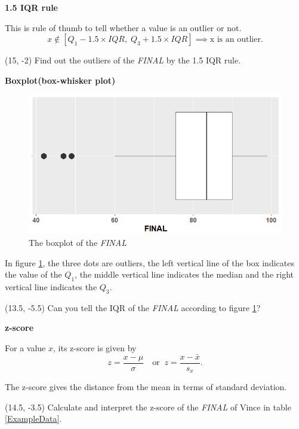 \documentclass[a4paper, 12pt,twoside]{book}
\begin{document}
\begin{itemize}
\textbf{1.5 IQR rule}\vspace{0.3cm}

This is rule of thumb to tell whether a value is an outlier or not. 
$$x \notin [Q_1-1.5 \times IQR,\; Q_3+1.5 \times IQR] \implies \text{x is an outlier}.$$

\begin{textblock}{3.6}(15, -2)
Find out the outliers of the \textit{FINAL} by the 1.5 IQR rule.
\end{textblock}
\vspace{0.3cm}

\textbf{Boxplot(box-whisker plot)}
\begin{figure}[H]
\centering
\includegraphics[scale=0.4]{Boxplot.png}
\caption{The boxplot of the \textit{FINAL}}
\label{Boxplot}
\end{figure}
In figure \ref{Boxplot}, the three dots are outliers, the left vertical line of the box indicates the value of the $Q_1$, the middle vertical line indicates the median and the right vertical line indicates the $Q_3$.
\begin{textblock}{4.8}(13.5, -5.5)
 Can you tell the IQR of the \textit{FINAL} according to figure \ref{Boxplot}?
\end{textblock}
\vspace{0.6cm}

\textbf{z-score}\vspace{0.3cm}

For a value $x$, its z-score is given by $$z=\frac{x-\mu}{\sigma} \quad \text{or}\;\; z=\frac{x-\bar{x}}{s_x}.$$
\colorbox{babypink}{\parbox{13.2cm}{The z-score  gives the distance from the mean in terms of standard deviation.}}

\begin{textblock}{4}(14.5, -3.5)
Calculate and interpret the z-score of the \textit{FINAL} of Vince in table \ref{ExampleData}.
\end{textblock}

\end{itemize}
\newpage
\end{document}
